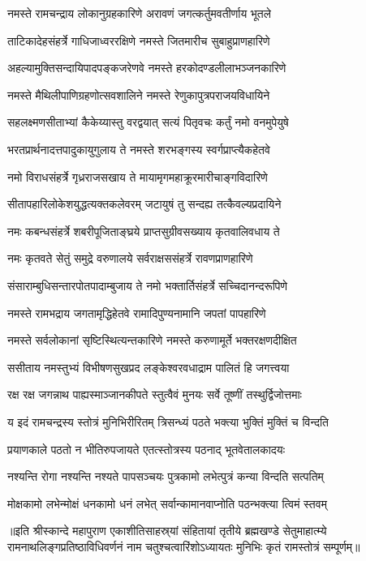 
\addtocounter{shlokacount}{62}

\twolineshloka
{नमस्ते रामचन्द्राय लोकानुग्रहकारिणे}
{अरावणं जगत्कर्तुमवतीर्णाय भूतले} %

\twolineshloka
{ताटिकादेहसंहर्त्रे गाधिजाध्वररक्षिणे}
{नमस्ते जितमारीच सुबाहुप्राणहारिणे} %

\twolineshloka
{अहल्यामुक्तिसन्दायिपादपङ्कजरेणवे}
{नमस्ते हरकोदण्डलीलाभञ्जनकारिणे} %

\twolineshloka
{नमस्ते मैथिलीपाणिग्रहणोत्सवशालिने}
{नमस्ते रेणुकापुत्रपराजयविधायिने} %

\twolineshloka
{सहलक्ष्मणसीताभ्यां कैकेय्यास्तु वरद्वयात्}
{सत्यं पितृवचः कर्तुं नमो वनमुपेयुषे} %

\twolineshloka
{भरतप्रार्थनादत्तपादुकायुगुलाय ते}
{नमस्ते शरभङ्गस्य स्वर्गप्राप्त्यैकहेतवे} %

\twolineshloka
{नमो विराधसंहर्त्रे गृध्रराजसखाय ते}
{मायामृगमहाक्रूरमारीचाङ्गविदारिणे} %

\twolineshloka
{सीतापहारिलोकेशयुद्धत्यक्तकलेवरम्}
{जटायुषं तु सन्दह्य तत्कैवल्यप्रदायिने} %

\twolineshloka
{नमः कबन्धसंहर्त्रे शबरीपूजिताङ्घ्रये}
{प्राप्तसुग्रीवसख्याय कृतवालिवधाय ते} %

\twolineshloka
{नमः कृतवते सेतुं समुद्रे वरुणालये}
{सर्वराक्षससंहर्त्रे रावणप्राणहारिणे} %

\twolineshloka
{संसाराम्बुधिसन्तारपोतपादाम्बुजाय ते}
{नमो भक्तार्तिसंहर्त्रे सच्चिदानन्दरूपिणे} %

\twolineshloka
{नमस्ते रामभद्राय जगतामृद्धिहेतवे}
{रामादिपुण्यनामानि जपतां पापहारिणे} %

\twolineshloka
{नमस्ते सर्वलोकानां सृष्टिस्थित्यन्तकारिणे}
{नमस्ते करुणामूर्ते भक्तरक्षणदीक्षित} %

\twolineshloka
{ससीताय नमस्तुभ्यं विभीषणसुखप्रद}
{लङ्केश्वरवधाद्राम पालितं हि जगत्त्वया} %

\twolineshloka
{रक्ष रक्ष जगन्नाथ पाह्यस्माञ्जानकीपते}
{स्तुत्वैवं मुनयः सर्वे तूष्णीं तस्थुर्द्विजोत्तमाः} %


\twolineshloka
{य इदं रामचन्द्रस्य स्तोत्रं मुनिभिरीरितम्}
{त्रिसन्ध्यं पठते भक्त्या भुक्तिं मुक्तिं च विन्दति} %

\twolineshloka
{प्रयाणकाले पठतो न भीतिरुपजायते}
{एतत्स्तोत्रस्य पठनाद् भूतवेतालकादयः} %

\twolineshloka
{नश्यन्ति रोगा नश्यन्ति नश्यते पापसञ्चयः}
{पुत्रकामो लभेत्पुत्रं कन्या विन्दति सत्पतिम्} %

\twolineshloka
{मोक्षकामो लभेन्मोक्षं धनकामो धनं लभेत्}
{सर्वान्कामानवाप्नोति पठन्भक्त्या त्विमं स्तवम्} %

॥इति श्रीस्कान्दे महापुराण एकाशीतिसाहस्र्यां संहितायां तृतीये ब्रह्मखण्डे सेतुमाहात्म्ये रामनाथलिङ्गप्रतिष्ठाविधिवर्णनं नाम चतुश्चत्वारिंशोऽध्यायतः मुनिभिः कृतं रामस्तोत्रं सम्पूर्णम्॥
